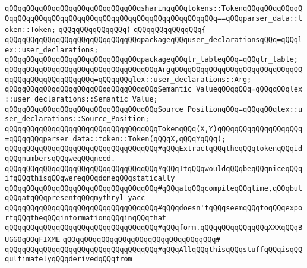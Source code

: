 \verb|qQQqqQQqqQQqqQQqqQQqqQQqqQQqqQQqsharingqQQqtokens::TokenqQQqqQQqqQQqqQQqqQQqqQQqqQQqqQQqqQQqqQQqqQQqqQQqqQQqqQQqqQQqqQQq==qQQqparser_data::token::Token;|\newline
\verb|qQQqqQQqqQQqqQQq)|\newline
\verb|qQQqqQQqqQQqqQQq{|\newline
\verb|qQQqqQQqqQQqqQQqqQQqqQQqqQQqqQQqpackageqQQquser_declarationsqQQq=qQQqlex::user_declarations;|\newline
\newline
\verb|qQQqqQQqqQQqqQQqqQQqqQQqqQQqqQQqpackageqQQqlr_tableqQQq=qQQqlr_table;|\newline
\newline
\newline
\verb|qQQqqQQqqQQqqQQqqQQqqQQqqQQqqQQqqQQqArgqQQqqQQqqQQqqQQqqQQqqQQqqQQqqQQqqQQqqQQqqQQqqQQqqQQq=qQQqqQQqlex::user_declarations::Arg;|\newline
\verb|qQQqqQQqqQQqqQQqqQQqqQQqqQQqqQQqqQQqSemantic_ValueqQQqqQQq=qQQqqQQqlex::user_declarations::Semantic_Value;|\newline
\verb|qQQqqQQqqQQqqQQqqQQqqQQqqQQqqQQqqQQqSource_PositionqQQq=qQQqqQQqlex::user_declarations::Source_Position;|\newline
\newline
\verb|qQQqqQQqqQQqqQQqqQQqqQQqqQQqqQQqqQQqTokenqQQq(X,Y)qQQqqQQqqQQqqQQqqQQq=qQQqqQQqparser_data::token::Token(qQQqX,qQQqYqQQq);|\newline
\newline
\newline
\verb|qQQqqQQqqQQqqQQqqQQqqQQqqQQqqQQqqQQq#qQQqExtractqQQqtheqQQqtokenqQQqidqQQqnumbersqQQqweqQQqneed.|\newline
\verb|qQQqqQQqqQQqqQQqqQQqqQQqqQQqqQQqqQQq#qQQqItqQQqwouldqQQqbeqQQqniceqQQqifqQQqthisqQQqwereqQQqdoneqQQqstatically|\newline
\verb|qQQqqQQqqQQqqQQqqQQqqQQqqQQqqQQqqQQq#qQQqatqQQqcompileqQQqtime,qQQqbutqQQqatqQQqpresentqQQqmythryl-yacc|\newline
\verb|qQQqqQQqqQQqqQQqqQQqqQQqqQQqqQQqqQQq#qQQqdoesn'tqQQqseemqQQqtoqQQqexportqQQqtheqQQqinformationqQQqinqQQqthat|\newline
\verb|qQQqqQQqqQQqqQQqqQQqqQQqqQQqqQQqqQQq#qQQqform.qQQqqQQqqQQqqQQqXXXqQQqBUGGOqQQqFIXME|\newline
\verb|qQQqqQQqqQQqqQQqqQQqqQQqqQQqqQQqqQQq#|\newline
\verb|qQQqqQQqqQQqqQQqqQQqqQQqqQQqqQQqqQQq#qQQqAllqQQqthisqQQqstuffqQQqisqQQqultimatelyqQQqderivedqQQqfrom|\newline

